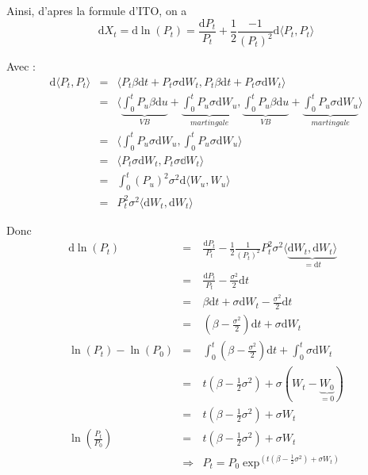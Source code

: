 \documentclass{report}
\begin{document}
Ainsi, d'apres la formule d'ITO, on a \[\mathrm{d}X_t=\mathrm{d}\ln(P_t) = \displaystyle\frac{\mathrm{d}P_t}{P_t} +\displaystyle\frac{1}{2}\displaystyle\frac{-1}{(P_t)^2}\mathrm{d}\langle P_t,P_t\rangle\]

Avec : 
\begin{eqnarray}
\mathrm{d}\langle P_t, P_t\rangle&=& \Bigg\langle P_t\beta \mathrm{d}t + P_t\sigma \mathrm{d}W_t, P_t\beta \mathrm{d}t + P_t\sigma \mathrm{d}W_t\Bigg\rangle\nonumber\\
&=&\Bigg\langle \underbrace{\displaystyle\int^t_0P_u\beta \mathrm{d}u}_{VB} + \underbrace{\displaystyle\int^t_0P_u\sigma \mathrm{d}W_u}_{martingale} ,\underbrace{\displaystyle\int^t_0P_u\beta \mathrm{d}u}_{VB} + \underbrace{\displaystyle\int^t_0P_u\sigma \mathrm{d}W_u}_{martingale}\Bigg\rangle\nonumber\\
&=&\Bigg\langle \displaystyle\int^t_0P_u\sigma \mathrm{d}W_u,\displaystyle\int^t_0P_u\sigma \mathrm{d}W_u\Bigg\rangle\nonumber\\
&=&\Bigg\langle P_t \sigma \mathrm{d}W_t,P_t \sigma \mathbb{d}W_t\Bigg\rangle\nonumber\\
&=& \displaystyle\int^t_0 (P_u)^2\sigma^2\mathrm{d}\langle W_u,W_u\rangle\nonumber\\
&=& P^2_t\sigma^2\langle \mathrm{d}W_t,\mathrm{d}W_t \rangle \nonumber
\end{eqnarray}

Donc 
\begin{eqnarray}
\mathrm{d}\ln(P_t)&=& \displaystyle\frac{\mathrm{d}P_t}{P_t} -\displaystyle\frac{1}{2}\displaystyle\frac{1}{(P_t)^2} P^2_t\sigma^2\langle \underbrace{\mathrm{d}W_t,\mathrm{d}W_t \rangle}_{=\mathrm{d}t} \nonumber\\
&=& \displaystyle\frac{\mathrm{d}P_t}{P_t} -\displaystyle\frac{\sigma^2}{2} \mathrm{d}t \nonumber\\
&=&\beta \mathrm{d}t+\sigma\mathrm{d}W_t-\displaystyle\frac{\sigma^2}{2} \mathrm{d}t \nonumber\\
&=&(\beta -\displaystyle\frac{\sigma^2}{2}) \mathrm{d}t + \sigma\mathrm{d}W_t\nonumber\\
\ln(P_t)-\ln(P_0)&=& \int_0^t(\beta -\displaystyle\frac{\sigma^2}{2}) \mathrm{d}t + \int_0^t\sigma\mathrm{d}W_t\nonumber\\
&=&t(\beta - \frac{1}{2}\sigma^2) + \sigma(W_t-\underbrace{W_0}_{=0})\nonumber\\
&=&t(\beta - \frac{1}{2}\sigma^2) + \sigma W_t\nonumber\\
\ln(\displaystyle\frac{P_t}{P_0})&=& t(\beta - \frac{1}{2}\sigma^2) + \sigma W_t\nonumber\\
&\Rightarrow&P_t = P_0 \exp^{(t(\beta - \frac{1}{2}\sigma^2) + \sigma W_t)}\nonumber
\end{eqnarray}
\end{document}
